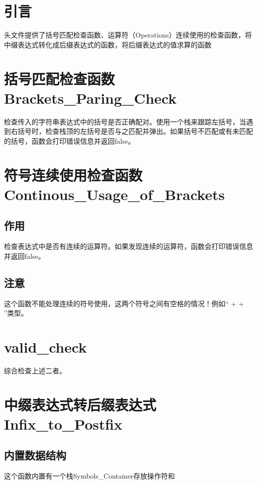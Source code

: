 \documentclass{article}
\begin{document}
\pagestyle{fancy}
\fancyhead{}

\section{引言}

头文件提供了括号匹配检查函数、运算符（Operations）连续使用的检查函数，将中缀表达式转化成后缀表达式的函数，将后缀表达式的值求算的函数

\section{括号匹配检查函数Brackets\_Paring\_Check}

检查传入的字符串表达式中的括号是否正确配对。使用一个栈来跟踪左括号，当遇到右括号时，检查栈顶的左括号是否与之匹配并弹出。如果括号不匹配或有未匹配的括号，函数会打印错误信息并返回false。

\section{符号连续使用检查函数Continous\_Usage\_of\_Brackets}

\subsection{作用}检查表达式中是否有连续的运算符。如果发现连续的运算符，函数会打印错误信息并返回false。

\subsection{注意}这个函数不能处理连续的符号使用，这两个符号之间有空格的情况！例如“ + + ”类型。

\section{valid\_check}

综合检查上述二者。

\section{中缀表达式转后缀表达式Infix\_to\_Postfix}

\subsection{内置数据结构}这个函数内置有一个栈Symbols\_Container存放操作符和
\end{document}

